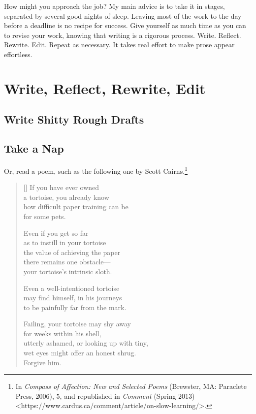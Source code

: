 \documentclass[11pt,twocolumn]{article}
\begin{document}

How might you approach the job? My main advice is to take it in stages,
separated by several good nights of sleep. Leaving most of the work to
the day before a deadline is no recipe for success. Give yourself as
much time as you can to revise your work, knowing that writing is a
rigorous process. Write. Reflect. Rewrite. Edit. Repeat as necessary. It
takes real effort to make prose appear effortless.

\section{Write, Reflect, Rewrite, Edit}

\subsection{Write Shitty Rough Drafts}

\subsection{Take a Nap}


Or, read a poem, such as the following one by Scott Cairns.\footnote{In \emph{Compass of Affection: New and Selected Poems} (Brewster, MA: Paraclete Press, 2006), 5, and republished in \emph{Comment} (Spring 2013) <https://www.cardus.ca/comment/article/on-slow-learning/>.}

\settowidth{\versewidth}{how difficult paper training can be}
\begin{verse}[\versewidth]
If you have ever owned\\
a tortoise, you already know\\
how difficult paper training can be\\
for some pets.

Even if you get so far\\
as to instill in your tortoise\\
the value of achieving the paper\\
there remains one obstacle—\\
your tortoise’s intrinsic sloth.

Even a well-intentioned tortoise\\
may find himself, in his journeys\\
to be painfully far from the mark.

Failing, your tortoise may shy away\\
for weeks within his shell,\\
utterly ashamed, or looking up with tiny,\\
wet eyes might offer an honest shrug.\\
Forgive him.
\end{verse}
\end{document}
